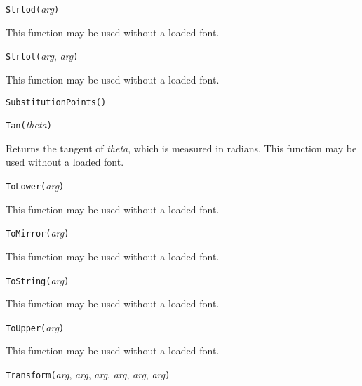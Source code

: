 \texttt{Strtod(}\textit{arg}\texttt{)}

This function may be used without a loaded font.



\texttt{Strtol(}\textit{arg}, \textit{arg}\texttt{)}

This function may be used without a loaded font.



\texttt{SubstitutionPoints(}\texttt{)}



\texttt{Tan(}\textit{theta}\texttt{)}

Returns the tangent of \textit{theta}, which is measured in radians.
This function may be used without a loaded font.



\texttt{ToLower(}\textit{arg}\texttt{)}

This function may be used without a loaded font.



\texttt{ToMirror(}\textit{arg}\texttt{)}

This function may be used without a loaded font.



\texttt{ToString(}\textit{arg}\texttt{)}

This function may be used without a loaded font.



\texttt{ToUpper(}\textit{arg}\texttt{)}

This function may be used without a loaded font.



\texttt{Transform(}\textit{arg}, \textit{arg}, \textit{arg}, \textit{arg}, \textit{arg}, \textit{arg}\texttt{)}

